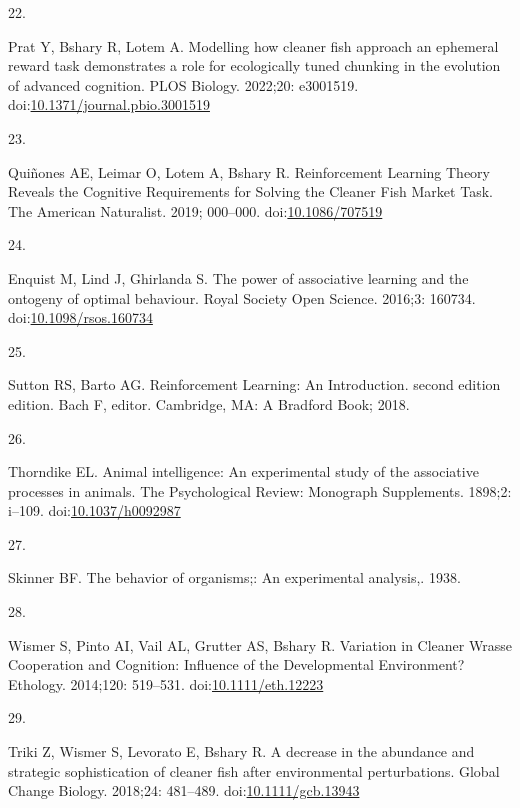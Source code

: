 \documentclass[10pt,letterpaper]{article}
\newlength{\cslhangindent}
\newlength{\csllabelwidth}
\newlength{\cslentryspacingunit} %
\newenvironment{CSLReferences}[2] %
 {%
  \setlength{\parindent}{0pt}
  \ifodd #1
  \let\oldpar\par
  \def\par{\hangindent=\cslhangindent\oldpar}
  \fi
  \setlength{\parskip}{#2\cslentryspacingunit}
 }%
 {}
\newcommand{\CSLLeftMargin}[1]{\parbox[t]{\csllabelwidth}{#1}}
\newcommand{\CSLRightInline}[1]{\parbox[t]{\linewidth - \csllabelwidth}{#1}\break}
\begin{document}
\begin{CSLReferences}{0}{0}
\leavevmode{}%
\CSLLeftMargin{22. }
\CSLRightInline{Prat Y, Bshary R, Lotem A. Modelling how cleaner fish
approach an ephemeral reward task demonstrates a role for ecologically
tuned chunking in the evolution of advanced cognition. PLOS Biology.
2022;20: e3001519.
doi:\href{https://doi.org/10.1371/journal.pbio.3001519}{10.1371/journal.pbio.3001519}}

\leavevmode{}%
\CSLLeftMargin{23. }
\CSLRightInline{Quiñones AE, Leimar O, Lotem A, Bshary R. Reinforcement
{Learning} {Theory} {Reveals} the {Cognitive} {Requirements} for
{Solving} the {Cleaner} {Fish} {Market} {Task}. The American Naturalist.
2019; 000--000.
doi:\href{https://doi.org/10.1086/707519}{10.1086/707519}}

\leavevmode{}%
\CSLLeftMargin{24. }
\CSLRightInline{Enquist M, Lind J, Ghirlanda S. The power of associative
learning and the ontogeny of optimal behaviour. Royal Society Open
Science. 2016;3: 160734.
doi:\href{https://doi.org/10.1098/rsos.160734}{10.1098/rsos.160734}}

\leavevmode{}%
\CSLLeftMargin{25. }
\CSLRightInline{Sutton RS, Barto AG. Reinforcement {Learning}: {An}
{Introduction}. second edition edition. Bach F, editor. Cambridge, MA: A
Bradford Book; 2018. }

\leavevmode{}%
\CSLLeftMargin{26. }
\CSLRightInline{Thorndike EL. Animal intelligence: {An} experimental
study of the associative processes in animals. The Psychological Review:
Monograph Supplements. 1898;2: i--109.
doi:\href{https://doi.org/10.1037/h0092987}{10.1037/h0092987}}

\leavevmode{}%
\CSLLeftMargin{27. }
\CSLRightInline{Skinner BF. The behavior of organisms;: {An}
experimental analysis,. 1938. }

\leavevmode{}%
\CSLLeftMargin{28. }
\CSLRightInline{Wismer S, Pinto AI, Vail AL, Grutter AS, Bshary R.
Variation in {Cleaner} {Wrasse} {Cooperation} and {Cognition}:
{Influence} of the {Developmental} {Environment}? Ethology. 2014;120:
519--531.
doi:\href{https://doi.org/10.1111/eth.12223}{10.1111/eth.12223}}

\leavevmode{}%
\CSLLeftMargin{29. }
\CSLRightInline{Triki Z, Wismer S, Levorato E, Bshary R. A decrease in
the abundance and strategic sophistication of cleaner fish after
environmental perturbations. Global Change Biology. 2018;24: 481--489.
doi:\href{https://doi.org/10.1111/gcb.13943}{10.1111/gcb.13943}}


\end{CSLReferences}
\end{document}
